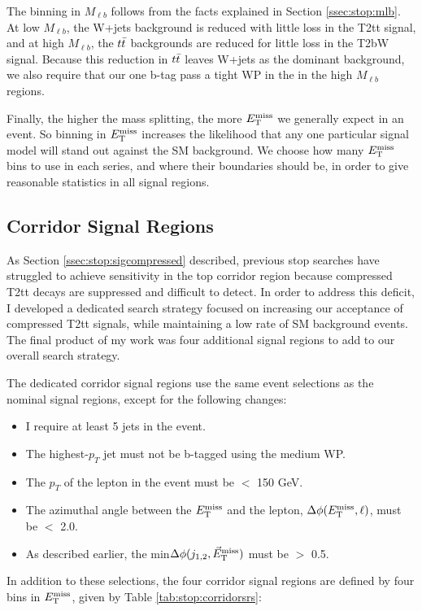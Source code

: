 The binning in $M_{\ell b}$ follows from the facts explained in
Section \ref{ssec:stop:mlb}. At low $M_{\ell b}$, the W+jets
background is reduced with little loss in the T2tt signal, and at high
$M_{\ell b}$, the $t\bar{t}$ backgrounds are reduced for little loss in
the T2bW signal. Because this reduction in $t\bar{t}$ leaves W+jets as
the dominant background, we also require that our one b-tag pass a
tight WP in the in the high $M_{\ell b}$ regions.

Finally, the higher the mass splitting, the more $E_\text{T}^\text{miss}$ we generally
expect in an event. So binning in $E_\text{T}^\text{miss}$ increases the
likelihood that any one particular signal model will stand out against the
SM background. We choose how many $E_\text{T}^\text{miss}$ bins to use in each series,
and where their boundaries should be, in order to give reasonable
statistics in all signal regions.

\subsection{Corridor Signal Regions}
\label{ssec:stop:sigregscorridor}

As Section \ref{ssec:stop:sigcompressed} described, previous stop
searches have struggled to achieve sensitivity in the top corridor
region because compressed T2tt decays are suppressed and difficult to
detect. In order to address this deficit, I developed a dedicated
search strategy focused on increasing our acceptance of compressed
T2tt signals, while maintaining a low rate of SM background
events. The final product of my work was four additional signal
regions to add to our overall search strategy.

The dedicated corridor signal regions use the same event selections as
the nominal signal regions, except for the following changes:
\begin{itemize}
\item I require at least 5 jets in the event.
\item The highest-$p_T$ jet must not be b-tagged using the medium WP.
\item The $p_T$ of the lepton in the event must be $<$ 150 GeV.
\item The azimuthal angle between the $E_\text{T}^\text{miss}$ and the lepton, $\Delta
  \phi (E_\text{T}^\text{miss}, \ell)$, must be $<$ 2.0.
\item As described earlier, the min$\Delta \phi(j_{1,2},\vec{E}_\text{T}^\text{miss})$
  must be $>$ 0.5.
\end{itemize}
In addition to these selections, the four corridor signal regions are
defined by four bins in $E_\text{T}^\text{miss}$, given by Table \ref{tab:stop:corridorsrs}:

